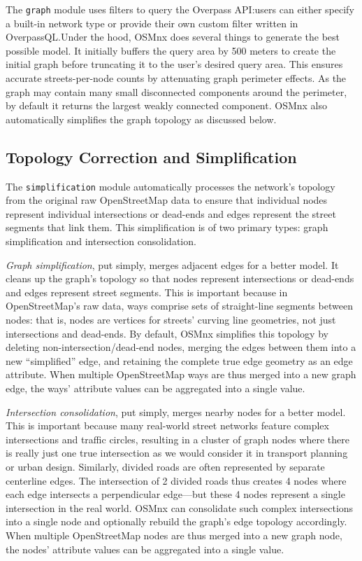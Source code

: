 \documentclass[12pt,letterpaper]{article} %
\begin{document}
The \texttt{graph} module uses filters to query the Overpass API:\@ users can either specify a built-in network type or provide their own custom filter written in OverpassQL.\@ Under the hood, OSMnx does several things to generate the best possible model. It initially buffers the query area by 500 meters to create the initial graph before truncating it to the user's desired query area. This ensures accurate streets-per-node counts by attenuating graph perimeter effects. As the graph may contain many small disconnected components around the perimeter, by default it returns the largest weakly connected component. OSMnx also automatically simplifies the graph topology as discussed below.

\subsection{Topology Correction and Simplification}

The \texttt{simplification} module automatically processes the network's topology from the original raw OpenStreetMap data to ensure that individual nodes represent individual intersections or dead-ends and edges represent the street segments that link them. This simplification is of two primary types: graph simplification and intersection consolidation.

\textit{Graph simplification}, put simply, merges adjacent edges for a better model. It cleans up the graph's topology so that nodes represent intersections or dead-ends and edges represent street segments. This is important because in OpenStreetMap's raw data, ways comprise sets of straight-line segments between nodes: that is, nodes are vertices for streets' curving line geometries, not just intersections and dead-ends. By default, OSMnx simplifies this topology by deleting non-intersection/dead-end nodes, merging the edges between them into a new \enquote{simplified} edge, and retaining the complete true edge geometry as an edge attribute. When multiple OpenStreetMap ways are thus merged into a new graph edge, the ways' attribute values can be aggregated into a single value.

\textit{Intersection consolidation}, put simply, merges nearby nodes for a better model. This is important because many real-world street networks feature complex intersections and traffic circles, resulting in a cluster of graph nodes where there is really just one true intersection as we would consider it in transport planning or urban design. Similarly, divided roads are often represented by separate centerline edges. The intersection of 2 divided roads thus creates 4 nodes where each edge intersects a perpendicular edge---but these 4 nodes represent a single intersection in the real world. OSMnx can consolidate such complex intersections into a single node and optionally rebuild the graph's edge topology accordingly. When multiple OpenStreetMap nodes are thus merged into a new graph node, the nodes' attribute values can be aggregated into a single value.
\end{document}
